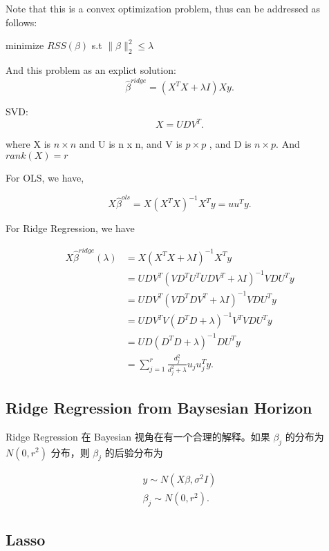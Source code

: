\documentclass[UTF8]{ctexart}
\begin{document}
Note that this is a convex optimization problem, thus can be addressed as follows:

\begin{center}
    {minimize} $RSS\left( \beta \right) $
    s.t $\|\beta\|_2^2 \le \lambda$
\end{center}

And this problem as an explict solution: \[
    \hat{\beta}^{ridge} = \left( X^{T}X + \lambda I\right) X y
.\] 


SVD: \[
    X = UDV^{T}
.\] 

where X is $n \times n$ and U is n x n, and V is $p \times p$ , and D is $n \times p$. And $rank\left(X  \right) = r$ 

For OLS, we have,

\[
    X \hat{\beta}^{ols} = X \left( X^TX \right) ^{-1} X^{T} y = u u^{T} y
.\] 

For Ridge Regression, we have

\begin{align*}
    X \hat{\beta}^{ridge}\left( \lambda \right)  &= X\left(X^{T}X + \lambda I  \right)  ^{-1} X ^{T}y \\
    &= UDV^{T}\left(VD^{T}U^{T}UDV^{T} + \lambda I  \right) ^{-1} VDU^{T} y \\
    &= UDV^{T}\left(VD^{T}DV^{T} + \lambda I \right)^{-1} VDU^T y \\
    &= UDV^TV(D^TD + \lambda)^{-1} V^TV DU^Ty \\
    &= UD(D^TD + \lambda)^{-1} D U^T y \\
    &= \sum_{j=1}^{r} \frac{d_j^2}{d_j^2 + \lambda} u_j u_j^T y
.\end{align*}

\subsection{Ridge Regression from Baysesian Horizon}%
\label{sub:ridge_regression_from_baysesian_horizon}

Ridge Regression 在 Bayesian 视角在有一个合理的解释。如果 $\beta_j$ 的分布为 $N\left(0, r^2 \right) $ 分布，则 $\beta_j$ 的后验分布为

\begin{align*}
    y \sim N(X\beta, \sigma^2 I) \\
    \beta_j \sim N(0, r^2)
.\end{align*}

\subsection{Lasso}%
\label{sub:lasso}
\end{document}
